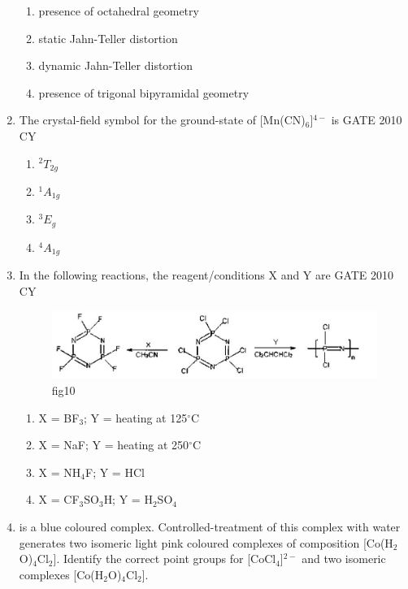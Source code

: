 \documentclass[journal,12pt,onecolumn]{IEEEtran}
\theoremstyle{remark}
\begin{document}
\begin{enumerate}
\begin{multicols}{2}
\begin{enumerate}
    \item presence of octahedral geometry
    \item static Jahn-Teller distortion
    \item dynamic Jahn-Teller distortion
    \item presence of trigonal bipyramidal geometry
\end{enumerate}
\end{multicols}

\item The crystal-field symbol for the ground-state of [Mn(CN)$_6$]$^{4-}$ is
\hfill{GATE 2010 CY}

\begin{multicols}{2}
\begin{enumerate}
    \item $^2T_{2g}$
    \item $^1A_{1g}$
    \item $^3E_g$
    \item $^4A_{1g}$
\end{enumerate}
\end{multicols}

\item In the following reactions, the reagent/conditions X and Y are
\hfill{GATE 2010 CY}
\begin{figure}
    \centering
    \includegraphics[width=0.5\linewidth]{figs/Q.32.png}
    \caption{fig10}
    \label{fig:figs/Q.32.png}
\end{figure}

\begin{multicols}{2}
\begin{enumerate}
    \item X = BF$_3$; Y = heating at 125$^\circ$C
    \item X = NaF; Y = heating at 250$^\circ$C
    \item X = NH$_4$F; Y = HCl
    \item X = CF$_3$SO$_3$H; Y = H$_2$SO$_4$
\end{enumerate}
\end{multicols}

\item 
is a blue coloured complex. Controlled-treatment of this complex with water generates two isomeric light pink coloured complexes of composition [Co(H$_2$O)$_4$Cl$_2$]. Identify the correct point groups for [CoCl$_4$]$^{2-}$ and two isomeric complexes [Co(H$_2$O)$_4$Cl$_2$].


\end{enumerate}
\end{document}
